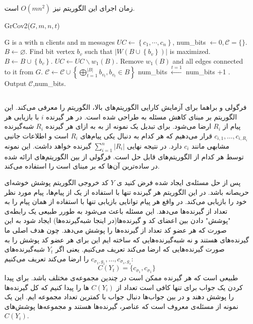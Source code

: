  زمان اجرای این الگوریتم نیز
 $O(mn^2)$
 است.
 	\begin{algorithm}[H]
 	\caption{GrCov2($G,m,n,t$) \cite{pliablefirstpaper}}
 	\label{algorithm:grcov2}
 	\begin{algorithmic}[1]
 		\State G is a \picodt with n clients and m messages
 		\State  $U C \leftarrow\left\{c_1, \cdots, c_n\right\}$,
 		\State  num\_bits $\leftarrow 0, \mathcal{C}=\{\}$.
		 		\State $B \leftarrow \varnothing$.
				 		\State  Find bit vertex $b_v$ such that $\left|W\left(B \cup\left\{b_v\right\}\right)\right|$ is maximized.
				 		\State  $B \leftarrow B \cup\left\{b_v\right\}$.
		 		\EndWhile
		 		\State  $UC \leftarrow UC \backslash w_1(B)$.
		 		\State Remove $w_1(B)$ and all edges connected to it from $G$.
		 		\State  $\mathcal{C} \leftarrow \mathcal{C} \cup\left\{\bigoplus_{t=1}^{|B|} b_{v_t}, b_{v_t} \in B\right\}$
		 		\State  num\_bits $\stackrel{t=1}{\leftarrow}$ num\_bits +1 .
 		\EndWhile
 		\State  Output $\mathcal{C}$,num\_bits.
 	\end{algorithmic}
 \end{algorithm} 
 \subsection{}
 فرگولی و براهما برای آزمایش کارایی الگوریتم‌های بالا، الگوریتم
 را معرفی می‌کند. این الگوریتم بر مبنای کاهش مسئله به
 \icod
 طراحی شده است. در 
 \picod
 هر گیرنده 
 $i$
 با بازیابی هر پیام از
 $R_i$
 ارضا می‌شود. برای تبدیل یک نمونه از
 \picod
 به
 \icod
 به ازای هر گیرنده
 $R_i$
 شبه‌گیرنده 
 $c_{i, 1}, \ldots, c_{i, {R_i}}$
 قرار می‌دهیم که هر کدام به دنبال یکی پیام‌های
 $R_i$
 است و اطلاعات جانبی مشابهی مانند
 $c_i$
 دارد. در نتیجه 
 \icod
 نهایی 
 $\sum\limits_{i = 1}^{n} |R_i|$
 گیرنده خواهد داشت. این نمونه توسط هر کدام از الگوریتم‌های
 \icod
 قابل حل است. فرگولی از بین الگوریتم‌های ارائه شده در
 \cite{25}
 ساده‌ترین آن‌ها که بر مبنای
 است را استفاده می‌کند.
 
 پس از حل مسئله‌ی
 \icod
 ایجاد شده فرض کنید ی
 $Y$
 کد خروجی الگوریتم پوشش خوشه‌ای حریصانه باشد. در این الگوریتم هر گیرنده تنها با استفاده از یک از پیام‌ها، پیام مورد نظر خود را بازیابی می‌کند. در واقع هر پیام توانایی بازیابی تنها با استفاده از همان پیام را به تعداد از گیرنده‌ها می‌دهد. این مسئله باعث می‌شود به طورر طبیعی یک رابطه‌ی "پوشش" دادن بین اعضای کد و گیرنده‌ها(در اینجا شبه‌گیرنده‌ها) ایجاد شود به این صورت که هر عضو کد تعداد از گیرنده‌ها را پوشش می‌دهد. چون هدف اصلی ما گیرنده‌های
 \picod
 هستند و نه شبه‌گیرنده‌هایی که ساخته ایم این برای هر عضو کد پوشش را به صورت گیرنده‌هایی که ارضا می‌کند تعریف می‌کنیم. یعنی اگر
 $Y_t$
 شبه‌گیرنده‌های
 $c_{\sigma_1, g_1}, \ldots, c_{\sigma_s, g_s}$
 را ارضا می‌کند تعریف می‌کنیم:
 $$C(Y_t) =\{ c_{\sigma_1}, c_{\sigma_1}\}$$
 طبیعی است که هر گیرنده ممکن است در چندین مجموعه‌ی مختلف باشد. برای پیدا کردن یک جواب برای
 \picod
 تنها کافی است تعداد از 
 $C(Y_i)$
 ها را پیدا کنیم که کل گیرنده‌ها را پوشش دهند و در بین جواب‌ها دنبال جواب با کمترین تعداد مجموعه‌ ایم. این یک نمونه از مسئله‌ی معروف
 است که عناصر، گیرنده‌ها هستند و مجموعه‌ها پوشش‌های
 $C(Y_i)$.
 
